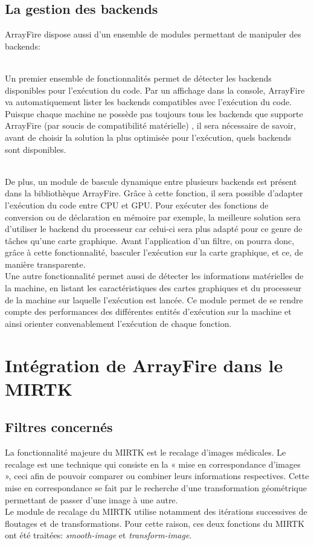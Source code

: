\documentclass[10pt]{report}
\begin{document}
	\subsection{La gestion des backends}
	
	ArrayFire dispose aussi d'un ensemble de modules permettant de manipuler des backends: \\ ~\par
	
	Un premier ensemble de fonctionnalités permet de détecter les backends disponibles pour l'exécution du code. Par un affichage dans la console, ArrayFire va automatiquement lister les backends compatibles avec l'exécution du code. Puisque chaque machine ne possède pas toujours tous les backends que supporte ArrayFire (par soucis de compatibilité matérielle) , il sera nécessaire de savoir, avant de choisir la solution la plus optimisée pour l'exécution, quels backends sont disponibles.\\ ~\par
	
	De plus, un module de bascule dynamique entre plusieurs backends est présent dans la bibliothèque ArrayFire. Grâce à cette fonction, il sera possible d'adapter l'exécution du code entre CPU et GPU. Pour exécuter des fonctions de conversion ou de déclaration en mémoire par exemple, la meilleure solution sera d'utiliser le backend du processeur car celui-ci sera plus adapté pour ce genre de tâches qu'une carte graphique. Avant l'application d'un filtre, on pourra donc, grâce à cette fonctionnalité, basculer l'exécution sur la carte graphique, et ce, de manière transparente.\\
	
	Une autre fonctionnalité permet aussi de détecter les informations matérielles de la machine, en listant les caractéristiques des cartes graphiques et du processeur de la machine sur laquelle l'exécution est lancée. Ce module permet de se rendre compte des performances des différentes entités d'exécution sur la machine et ainsi orienter convenablement l'exécution de chaque fonction.
	
	
	\section{Intégration de ArrayFire dans le MIRTK}
	\subsection{Filtres concernés}
	La fonctionnalité majeure du MIRTK est le recalage d'images médicales. Le recalage est une technique qui consiste en la « mise en correspondance d'images », ceci afin de pouvoir comparer ou combiner leurs informations respectives. Cette mise en correspondance se fait par le recherche d'une transformation géométrique permettant de passer d'une image à une autre.\\
	Le module de recalage du MIRTK utilise notamment des itérations successives de floutages et de transformations. Pour cette raison, ces deux fonctions du MIRTK ont été traitées: \textit{smooth-image} et \textit{transform-image}.
\end{document}
